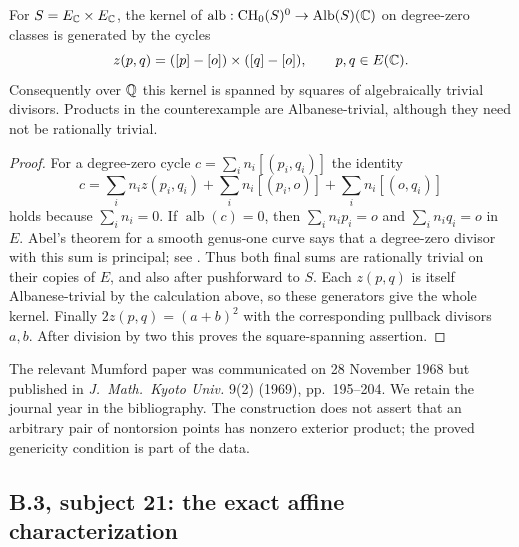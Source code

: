 \begin{proposition}\label{prop:B2-kernel}
For $S=E_{\mathbb{C}}\times E_{\mathbb{C}}$, the kernel of
$\operatorname{alb}:\mathrm{CH}_0(S)^0\to\operatorname{Alb}(S)({\mathbb{C}})$
on degree-zero classes is generated by the cycles
\[
 z(p,q)=([p]-[o])\times([q]-[o]),\qquad p,q\in E({\mathbb{C}}).
\]
Consequently over ${\mathbb{Q}}$ this kernel is spanned by squares of
algebraically trivial divisors. Products in the counterexample are
Albanese-trivial, although they need not be rationally trivial.
\end{proposition}
\begin{proof}
For a degree-zero cycle $c=\sum_i n_i[(p_i,q_i)]$ the identity
\[
 c=\sum_i n_i z(p_i,q_i)
       +\sum_i n_i[(p_i,o)]+\sum_i n_i[(o,q_i)]
\]
holds because $\sum_i n_i=0$. If $\operatorname{alb}(c)=0$, then
$\sum_i n_i p_i=o$ and $\sum_i n_i q_i=o$ in $E$.
Abel's theorem for a smooth genus-one curve says that a degree-zero
divisor with this sum is principal; see \cite[Lecture 0, pp.~3--4;
Lecture 1, p.~11]{BBloch1980}. Thus both final sums are rationally
trivial on their copies of $E$, and also after pushforward to $S$.
Each $z(p,q)$ is itself Albanese-trivial by the calculation above, so
these generators give the whole kernel. Finally
$2z(p,q)=(a+b)^2$ with the corresponding pullback divisors $a,b$.
After division by two this proves the square-spanning assertion.
\end{proof}

The relevant Mumford paper was communicated on 28 November 1968 but
published in \emph{J.~Math.~Kyoto Univ.} 9(2) (1969), pp.~195--204.
We retain the journal year in the bibliography. The construction does
not assert that an arbitrary pair of nontorsion points has nonzero
exterior product; the proved genericity condition is part of the data.

\subsection{B.3, subject 21: the exact affine characterization}


